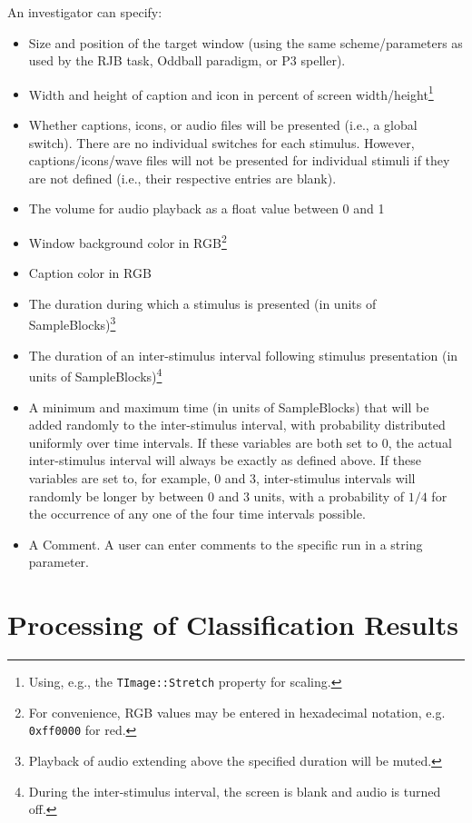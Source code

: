 \documentclass[letterpaper,oneside,12pt]{article}
\begin{document}
An investigator can specify:
\begin{itemize}
 \item Size and position of the target window (using the same scheme/parameters 
       as used by the RJB task, Oddball paradigm, or P3 speller).
 \item Width and height of caption and icon in percent of screen
       width/height\footnote{Using, e.g., the \texttt{TImage::Stretch} property for scaling.}
 \item Whether captions, icons, or audio files will be presented
       (i.e., a global switch). There are no individual switches for each stimulus. However,
       captions/icons/wave files will not be presented for individual stimuli if they are not defined (i.e., their respective entries are blank).
 \item The volume for audio playback as a float value between 0 and 1
 \item Window background color in RGB\footnote{For convenience, RGB values
       may be entered in hexadecimal notation, e.g. \texttt{0xff0000} for red.}
 \item Caption color in RGB
 \item The duration during which a stimulus is presented (in units of
       SampleBlocks)\footnote{Playback of audio extending above the specified duration 
       will be muted.}
 \item The duration of an inter-stimulus interval following stimulus presentation
       (in units of SampleBlocks)\footnote{During the inter-stimulus interval, the
       screen is blank and audio is turned off.}
 \item A minimum and maximum time (in units of SampleBlocks) that will be added randomly
       to the inter-stimulus interval, with probability distributed uniformly over time
       intervals.
       If these variables are both set to 0, the actual inter-stimulus interval will
       always be exactly as defined above.
       If these variables are set to, for example, 0 and 3, inter-stimulus intervals
       will randomly be longer by between 0 and 3 units, with a probability of $1/4$
       for the occurrence of any one of the four time intervals possible.
 \item A Comment. A user can enter comments to the specific run in a string parameter.
\end{itemize}


\section{Processing of Classification Results}
\end{document}
